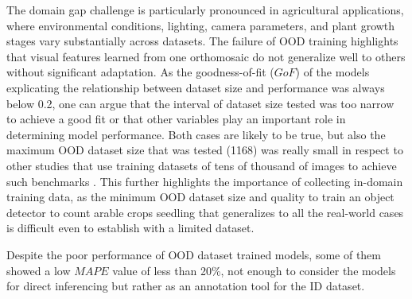 \documentclass[12pt,a4paper,oneside]{report}
\begin{document}
The domain gap challenge is particularly pronounced in agricultural applications, 
where environmental conditions, lighting, camera parameters, and plant growth stages 
vary substantially across datasets. The failure of OOD training highlights that visual 
features learned from one orthomosaic do not generalize well to others without 
significant adaptation. 
As the goodness-of-fit ($GoF$) of the models explicating the relationship between dataset size and performance
was always below 0.2, one can argue that the interval of dataset size tested was too narrow
to achieve a good fit or that other variables play an important role in determining model performance.
Both cases are likely to be true, but also the maximum OOD dataset size that
was tested (1168) was really small in respect to other studies that use training 
datasets of tens of thousand of images to achieve such benchmarks \cite{badgujarAgriculturalObjectDetection2024}.
This further highlights the importance of collecting in-domain training data, 
as the minimum OOD dataset size and quality to train an object detector to
count arable crops seedling that generalizes to all the real-world cases
is difficult even to establish with a limited dataset. 

Despite the poor performance of OOD dataset trained models, some of them showed a low $MAPE$ value of less than 20\%,
not enough to consider the models for direct inferencing but rather as an annotation
tool for the ID dataset.
\end{document}
